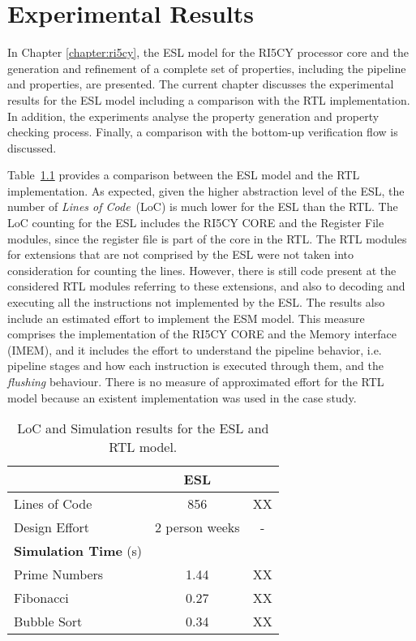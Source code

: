 \chapter{Experimental Results}

In Chapter \ref{chapter:ri5cy}, the ESL model for the RI5CY processor core and the generation and refinement of a complete set of properties, including the pipeline and \SSQED{} properties, are presented. The current chapter discusses the experimental results for the ESL model including a comparison with the RTL implementation. In addition, the experiments analyse the property generation and property checking process. Finally, a comparison with the bottom-up verification flow is discussed.

Table~\ref{tab:esl-rtl-comp} provides a comparison between the ESL model and the RTL implementation. As expected, given the higher abstraction level of the ESL, the number of \textit{Lines of Code}~(LoC) is much lower for the ESL than the RTL. The LoC counting for the ESL includes the RI5CY CORE and the Register File modules, since the register file is part of the core in the RTL. The RTL modules for extensions that are not comprised by the ESL were not taken into consideration for counting the lines. However, there is still code present at the considered RTL modules referring to these extensions, and also to decoding and executing all the instructions not implemented by the ESL. The results also include an estimated effort to implement the ESM model. This measure comprises the implementation of the RI5CY CORE and the Memory interface (IMEM), and it includes the effort to understand the pipeline behavior, i.e. pipeline stages and how each instruction is executed through them, and the \textit{flushing} behaviour. There is no measure of approximated effort for the RTL model because an existent implementation was used in the case study.  

\begin{table}[htb!] 
	\centering 
	\caption{LoC and Simulation results for the ESL and RTL model.} 
	\label{tab:esl-rtl-comp}
	\begin{tabular}{p{5cm} c c} 
		  &  \textbf{ESL} & \textbf{\SSSAY{RTL}} \\     
		\hline	
		Lines of Code  & 856 & XX \\
		Design Effort & 2 person weeks & - \\
		\hline
		\textbf{Simulation Time} (s) & & \\
		\hline
		Prime Numbers  &  1.44 & XX \\
		Fibonacci  &  0.27 & XX \\
		Bubble Sort  &  0.34 & XX \\
	\end{tabular} 
\end{table}

